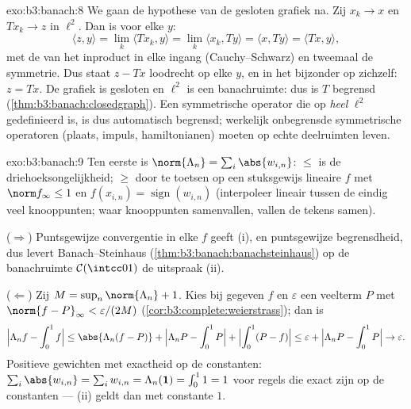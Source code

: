 \begin{solution}{exo:b3:banach:8}
We gaan de hypothese van de gesloten grafiek na. Zij $x_k \to x$
en $Tx_k \to z$ in $\ell^2$. Dan is voor elke $y$:
\[
\langle z, y\rangle = \lim_k\langle Tx_k, y\rangle
= \lim_k \langle x_k, Ty\rangle = \langle x, Ty\rangle
= \langle Tx, y\rangle,
\]
met de  van het inproduct in elke ingang
(Cauchy--Schwarz) en tweemaal de symmetrie. Dus staat $z - Tx$
loodrecht op elke $y$, en in het bijzonder op zichzelf: $z = Tx$.
De grafiek is gesloten en $\ell^2$ is een banachruimte: dus is $T$
begrensd (\cref{thm:b3:banach:closedgraph}). Een symmetrische
operator die op \emph{heel} $\ell^2$ gedefinieerd is, is dus
automatisch begrensd; werkelijk onbegrensde symmetrische
operatoren (plaats, impuls, hamiltonianen) moeten op echte 
deelruimten leven.
\end{solution}

\begin{solution}{exo:b3:banach:9}
Ten eerste is $\norm{\Lambda_n} = \sum_i\abs{w_{i,n}}$: $\leq$ is
de driehoeksongelijkheid; $\geq$ door te toetsen op een
stuksgewijs lineaire $f$ met $\norm f_\infty \leq 1$ en
$f(x_{i,n}) = \operatorname{sign}(w_{i,n})$ (interpoleer lineair
tussen de eindig veel knooppunten; waar knooppunten samenvallen,
vallen de tekens samen).

($\Rightarrow$) Puntsgewijze convergentie in elke $f$ geeft (i),
en puntsgewijze begrensdheid, dus levert Banach--Steinhaus
(\cref{thm:b3:banach:banachsteinhaus}) op de banachruimte
$\mathcal C(\intcc01)$ de uitspraak (ii).

($\Leftarrow$) Zij $M = \sup_n\norm{\Lambda_n} + 1$. Kies bij
gegeven $f$ en $\varepsilon$ een veelterm $P$ met $\norm{f -
P}_\infty < \varepsilon/(2M)$
(\cref{cor:b3:complete:weierstrass}); dan is
\[
\Bigl|\Lambda_n f - \int_0^1 f\Bigr|
\leq \abs{\Lambda_n(f - P)} + \Bigl|\Lambda_nP -
\int_0^1P\Bigr| + \Bigl|\int_0^1(P - f)\Bigr|
\leq \varepsilon + \Bigl|\Lambda_nP - \int_0^1P\Bigr| \to
\varepsilon .
\]
Positieve gewichten met exactheid op de constanten:
$\sum_i\abs{w_{i,n}} = \sum_iw_{i,n} = \Lambda_n(\mathbf 1) =
\int_0^1 1 = 1$ voor regels die exact zijn op de constanten ---
(ii) geldt dan met constante $1$.
\end{solution}

